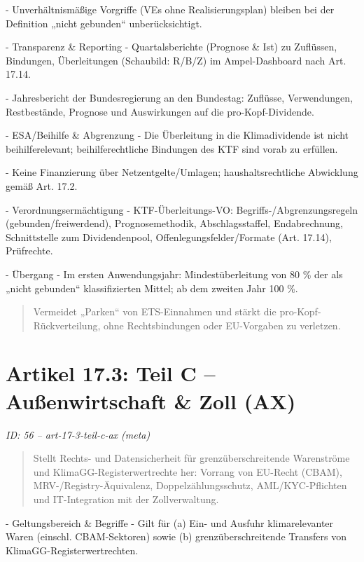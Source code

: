 \documentclass[12pt,a4paper]{scrartcl}
\begin{document}
- Unverhältnismäßige Vorgriffe (VEs ohne Realisierungsplan) bleiben bei der Definition „nicht gebunden“ unberücksichtigt.

- Transparenz \& Reporting
- Quartalsberichte (Prognose \& Ist) zu Zuflüssen, Bindungen, Überleitungen (Schaubild: R/B/Z) im Ampel-Dashboard nach Art. 17.14.

- Jahresbericht der Bundesregierung an den Bundestag: Zuflüsse, Verwendungen, Restbestände, Prognose und Auswirkungen auf die pro-Kopf-Dividende.

- ESA/Beihilfe \& Abgrenzung
- Die Überleitung in die Klimadividende ist nicht beihilferelevant; beihilferechtliche Bindungen des KTF sind vorab zu erfüllen.

- Keine Finanzierung über Netzentgelte/Umlagen; haushaltsrechtliche Abwicklung gemäß Art. 17.2.

- Verordnungsermächtigung
- KTF-Überleitungs-VO: Begriffs-/Abgrenzungsregeln (gebunden/freiwerdend), Prognosemethodik, Abschlagsstaffel, Endabrechnung, Schnittstelle zum Dividendenpool, Offenlegungsfelder/Formate (Art. 17.14), Prüfrechte.

- Übergang
- Im ersten Anwendungsjahr: Mindestüberleitung von 80 \% der als „nicht gebunden“ klassifizierten Mittel; ab dem zweiten Jahr 100 \%.

{\footnotesize\begin{quote}
Vermeidet „Parken“ von ETS-Einnahmen und stärkt die pro-Kopf-Rückverteilung, ohne Rechtsbindungen oder EU-Vorgaben zu verletzen.
\end{quote}}



\section[Artikel 17.3: Teil C -- Außenwirtschaft \& Zoll (AX)]{Artikel 17.3: Teil C -- Außenwirtschaft \& Zoll (AX)}
\noindent\textit{ID: 56 -- art-17-3-teil-c-ax (meta)}

\begin{quote}
Stellt Rechts- und Datensicherheit für grenzüberschreitende Warenströme und KlimaGG-Registerwertrechte her: Vorrang von EU-Recht (CBAM), MRV-/Registry-Äquivalenz, Doppelzählungsschutz, AML/KYC-Pflichten und IT-Integration mit der Zollverwaltung.
\end{quote}

- Geltungsbereich \& Begriffe
- Gilt für (a) Ein- und Ausfuhr klimarelevanter Waren (einschl. CBAM-Sektoren) sowie (b) grenzüberschreitende Transfers von KlimaGG-Registerwertrechten.
\end{document}
